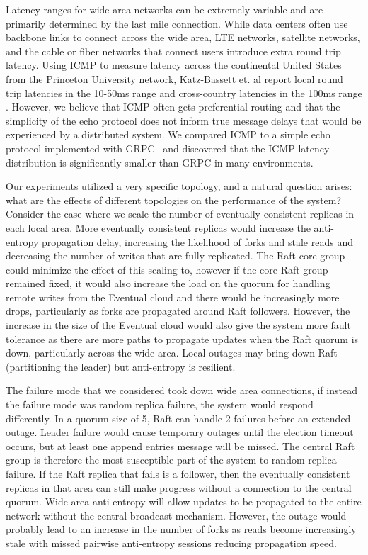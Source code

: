 \documentclass[10pt,conference,letterpaper]{IEEEtran}
\begin{document}
Latency ranges for wide area networks can be extremely variable and are primarily
determined by the last mile connection.
While data centers often use backbone links to connect across the wide area, LTE networks,
satellite networks, and the cable or fiber networks that connect users introduce extra
round trip latency.
Using ICMP to measure latency across the continental United States from the Princeton
University network, Katz-Bassett et.
al report local round trip latencies in the 10-50ms range and cross-country latencies in
the 100ms range \cite{katz-bassett_towards_2006}.
However, we believe that ICMP often gets preferential routing and that the simplicity of
the echo protocol does not inform true message delays that would be experienced by a
distributed system.
We compared ICMP to a simple echo protocol implemented with GRPC~\cite{grpc} and discovered that the
ICMP latency distribution is significantly smaller than GRPC in many environments.

Our experiments utilized a very specific topology, and a natural question arises: what are the effects of different topologies on the performance of the system? Consider the case where we scale the number of eventually consistent replicas in each local area. More eventually consistent replicas would increase the anti-entropy propagation delay, increasing the likelihood of forks and stale reads and decreasing the number of writes that are fully replicated. The Raft core group could minimize the effect of this scaling to, however if the core Raft group remained fixed, it would also increase the load on the quorum for handling remote writes from the Eventual cloud and there would be increasingly more drops, particularly as forks are propagated around Raft followers. However, the increase in the size of the Eventual cloud would also give the system more fault tolerance as there are more paths to propagate updates when the Raft quorum is down, particularly across the wide area. Local outages may bring down Raft (partitioning the leader) but anti-entropy is resilient.

The failure mode that we considered took down wide area connections, if instead the failure mode was random replica failure, the system would respond differently. In a quorum size of 5, Raft can handle 2 failures before an extended outage. Leader failure would cause temporary outages until the election timeout occurs, but at least one append entries message will be missed. The central Raft group is therefore the most susceptible part of the system to random replica failure. If the Raft replica that fails is a follower, then the eventually consistent replicas in that area can still make progress without a connection to the central quorum. Wide-area anti-entropy will allow updates to be propagated to the entire network without the central broadcast mechanism. However, the outage would probably lead to an increase in the number of forks as reads become increasingly stale with missed pairwise anti-entropy sessions reducing propagation speed.
\end{document}
